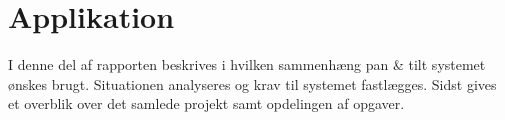 \cleardoublepage
{}
\setcounter{page}{1}
\part{Applikation}
I denne del af rapporten beskrives i hvilken sammenhæng pan & tilt systemet 
ønskes brugt. Situationen analyseres og krav til systemet fastlægges. Sidst 
gives et overblik over det samlede projekt samt opdelingen af opgaver.



